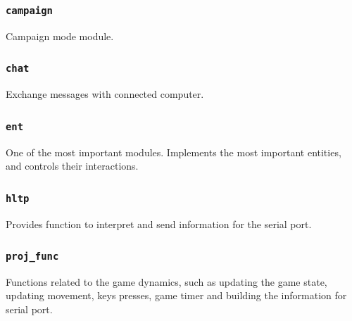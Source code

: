 \documentclass{article}
\theoremstyle{remark}
\begin{document}
\subsubsection{\texttt{campaign}}
Campaign mode module.
\subsubsection{\texttt{chat}}
Exchange messages with connected computer.
\subsubsection{\texttt{ent}}
One of the most important modules. Implements the most important entities, and controls their interactions.
\subsubsection{\texttt{hltp}}
Provides function to interpret and send information for the serial port.
\subsubsection{\texttt{proj\_func}}
Functions related to the game dynamics, such as updating the game state, updating movement, keys presses, game timer and building the information for serial port.
\end{document}
